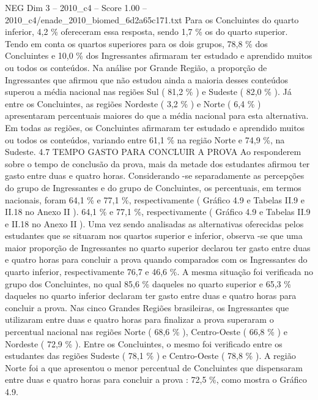\begin{textsample}{NEG Dim 3 – 2010\_c4 – Score 1.00 – 2010\_c4/enade\_2010\_biomed\_6d2a65c171.txt}
Para os Concluintes do quarto inferior, 4,2 \% ofereceram essa resposta, sendo 1,7 \% os do quarto superior.
Tendo em conta os quartos superiores para os dois grupos, 78,8 \% dos Concluintes e 10,0 \% dos Ingressantes afirmaram ter estudado e aprendido muitos ou todos os conteúdos.
Na análise por Grande Região, a proporção de Ingressantes que afirmou que não estudou ainda a maioria desses conteúdos superou a média nacional nas regiões Sul ( 81,2 \% ) e Sudeste ( 82,0 \% ).
Já entre os Concluintes, as regiões Nordeste ( 3,2 \% ) e Norte ( 6,4 \% ) apresentaram percentuais maiores do que a média nacional para esta alternativa.
Em todas as regiões, os Concluintes afirmaram ter estudado e aprendido muitos ou todos os conteúdos, variando entre 61,1 \% na região Norte e 74,9 \%, na Sudeste. 4.7 TEMPO GASTO PARA CONCLUIR A PROVA Ao responderem sobre o tempo de conclusão da prova, mais da metade dos estudantes afirmou ter gasto entre duas e quatro horas.
Considerando -se separadamente as percepções do grupo de Ingressantes e do grupo de Concluintes, os percentuais, em termos nacionais, foram 64,1 \% e 77,1 \%, respectivamente ( Gráfico 4.9 e Tabelas II.9 e II.18 no Anexo II ). 64,1 \% e 77,1 \%, respectivamente ( Gráfico 4.9 e Tabelas II.9 e II.18 no Anexo II ).
Uma vez sendo analisadas as alternativas oferecidas pelos estudantes que se situaram nos quartos superior e inferior, observa -se que uma maior proporção de Ingressantes no quarto superior declarou ter gasto entre duas e quatro horas para concluir a prova quando comparados com os Ingressantes do quarto inferior, respectivamente 76,7 e 46,6 \%.
A mesma situação foi verificada no grupo dos Concluintes, no qual 85,6 \% daqueles no quarto superior e 65,3 \% daqueles no quarto inferior declaram ter gasto entre duas e quatro horas para concluir a prova.
Nas cinco Grandes Regiões brasileiras, os Ingressantes que utilizaram entre duas e quatro horas para finalizar a prova superaram o percentual nacional nas regiões Norte ( 68,6 \% ), Centro-Oeste ( 66,8 \% ) e Nordeste ( 72,9 \% ).
Entre os Concluintes, o mesmo foi verificado entre os estudantes das regiões Sudeste ( 78,1 \% ) e Centro-Oeste ( 78,8 \% ).
A região Norte foi a que apresentou o menor percentual de Concluintes que dispensaram entre duas e quatro horas para concluir a prova : 72,5 \%, como mostra o Gráfico 4.9.

\end{textsample}
